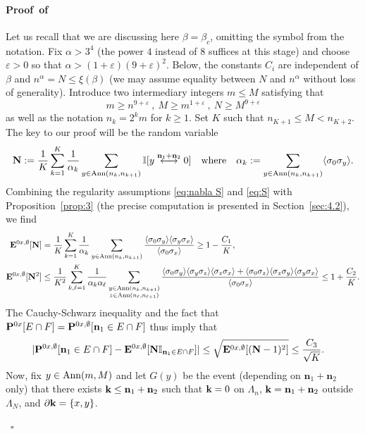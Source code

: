 \documentclass[a4paper,oneside,11pt]{article}
\newcommand{\be}[1]{\begin{equation}\label{#1}}
\newcommand{\ee}{\end{equation}}
\numberwithin{equation}{section}
\numberwithin{equation}{section}
\numberwithin{equation}{section}
\newenvironment{proof}[1][\relax]%
  {\paragraph{Proof\ifx#1\relax\else~of #1\fi}}%
  {~\hfill$\square$\par\bigskip}
\def\be{\begin{equation}}
\def\ee{\end{equation}}
\newcommand{\ep}{\varepsilon}
\newcommand{\n}{\mathbf{n}}
\begin{document}
\begin{proof}
Let us recall that we are discussing here $\beta=\beta_c$, omitting  the symbol from the notation.
Fix $\alpha>3^4$ (the power $4$ instead of $8$ suffices at this stage) and choose $\ep>0$ so that $\alpha>(1+\ep)(9+\ep)^2$. Below, the constants $C_i$ are independent of $\beta$ and $n^\alpha= N\le \xi(\beta)$ (we may assume equality between $N$ and $n^\alpha$ without loss of generality). Introduce two intermediary integers $m\le M$ satisfying that 
\be
m\ge n^{9+\ep}\ ,\  M\ge m^{1+\ep}\ ,\ N\ge M^{9+\ep}
\ee
as well as the notation $n_k=2^km$ for $k\ge1$. Set $K$ such that $n_{K+1}\le M<n_{K+2}$.
The key to our proof will be the random variable 
\be
{\bf N}:=\frac1{K}\sum_{k=1}^{K}\frac{1}{\alpha_{k}}\sum_{y\in{\rm Ann}(n_k,n_{k+1})}\mathbb I[y\stackrel{\n_1+\n_2}\longleftrightarrow0]\quad\text{where}\quad\alpha_k:=\sum_{y\in {\rm Ann}(n_k,n_{k+1})}\langle\sigma_0\sigma_y\rangle.
\ee
Combining the regularity assumptions \eqref{eq:nabla S} and \eqref{eq:S} with Proposition~\ref{prop:3} (the precise computation is presented in Section~\ref{sec:4.2}), we find 
\begin{align}{\bf E}^{0x,\emptyset}[{\bf N}]&=\frac1{K}\sum_{k=1}^{K}\frac{1}{\alpha_{k}}\sum_{y\in{\rm Ann}(n_k,n_{k+1})}\frac{\langle\sigma_0\sigma_y\rangle\langle\sigma_y\sigma_x\rangle}{\langle \sigma_0\sigma_x\rangle}\ge 1-\frac{C_1}{K},\\
{\bf E}^{0x,\emptyset}[{\bf N}^2]&\le\frac1{K^2}\sum_{k,\ell=1}^{K}\frac{1}{\alpha_{k}\alpha_\ell}\sum_{\substack{y\in{\rm Ann}(n_k,n_{k+1})\\ z\in {\rm Ann}(n_\ell,n_{\ell+1})}}\frac{\langle\sigma_0\sigma_y\rangle\langle\sigma_y\sigma_z\rangle\langle\sigma_z\sigma_x\rangle+\langle\sigma_0\sigma_z\rangle\langle\sigma_z\sigma_y\rangle\langle\sigma_y\sigma_x\rangle}{\langle \sigma_0\sigma_x\rangle}\le 1+\frac{C_2}{K}.\end{align}
The Cauchy-Schwarz inequality and the fact that ${\bf P}^{0x}[E\cap F]={\bf P}^{0x,\emptyset}[\n_1\in E\cap F]$ thus imply that
\begin{align}\label{eq:hgf}|{\bf P}^{0x,\emptyset}[\n_1\in E\cap F]-{\bf E}^{0x,\emptyset}[{\bf N}\mathbb I_{\n_1\in E\cap F}]|&\le \sqrt{{\bf E}^{0x,\emptyset}[({\bf N}-1)^2]}
\le \frac{C_3}{\sqrt K}.
\end{align}
Now, fix $y\in {\rm Ann}(m,M)$ and let $G(y)$ be the event (depending on $\n_1+\n_2$ only) that there exists ${\bf k}\le \n_1+\n_2$ such that ${\bf k}=0$ on $\Lambda_n$, ${\bf k}=\n_1+\n_2$ outside $\Lambda_N$, and $\partial{\bf k}=\{x,y\}$.

\end{proof}
\end{document}
